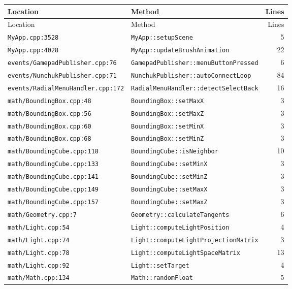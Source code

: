 \documentclass[11pt,a4paper]{article}
\begin{document}
{\footnotesize
\begin{longtable}{L{0.40\textwidth} L{0.48\textwidth} r}
\toprule
Location & Method & Lines \\
\midrule
\endfirsthead
\toprule
Location & Method & Lines \\
\midrule
\endhead
\texttt{MyApp.cpp:3528} & \texttt{MyApp::setupScene} & 5 \\
\texttt{MyApp.cpp:4028} & \texttt{MyApp::updateBrushAnimation} & 22 \\
\texttt{events/GamepadPublisher.cpp:76} & \texttt{GamepadPublisher::menuButtonPressed} & 6 \\
\texttt{events/NunchukPublisher.cpp:71} & \texttt{NunchukPublisher::autoConnectLoop} & 84 \\
\texttt{events/RadialMenuHandler.cpp:172} & \texttt{RadialMenuHandler::detectSelectBack} & 16 \\
\texttt{math/BoundingBox.cpp:48} & \texttt{BoundingBox::setMaxX} & 3 \\
\texttt{math/BoundingBox.cpp:56} & \texttt{BoundingBox::setMaxZ} & 3 \\
\texttt{math/BoundingBox.cpp:60} & \texttt{BoundingBox::setMinX} & 3 \\
\texttt{math/BoundingBox.cpp:68} & \texttt{BoundingBox::setMinZ} & 3 \\
\texttt{math/BoundingCube.cpp:118} & \texttt{BoundingCube::isNeighbor} & 10 \\
\texttt{math/BoundingCube.cpp:133} & \texttt{BoundingCube::setMinX} & 3 \\
\texttt{math/BoundingCube.cpp:141} & \texttt{BoundingCube::setMinZ} & 3 \\
\texttt{math/BoundingCube.cpp:149} & \texttt{BoundingCube::setMaxX} & 3 \\
\texttt{math/BoundingCube.cpp:157} & \texttt{BoundingCube::setMaxZ} & 3 \\
\texttt{math/Geometry.cpp:7} & \texttt{Geometry::calculateTangents} & 6 \\
\texttt{math/Light.cpp:54} & \texttt{Light::computeLightPosition} & 4 \\
\texttt{math/Light.cpp:74} & \texttt{Light::computeLightProjectionMatrix} & 3 \\
\texttt{math/Light.cpp:78} & \texttt{Light::computeLightSpaceMatrix} & 13 \\
\texttt{math/Light.cpp:92} & \texttt{Light::setTarget} & 4 \\
\texttt{math/Math.cpp:134} & \texttt{Math::randomFloat} & 5 \\

\end{longtable}}
\end{document}
